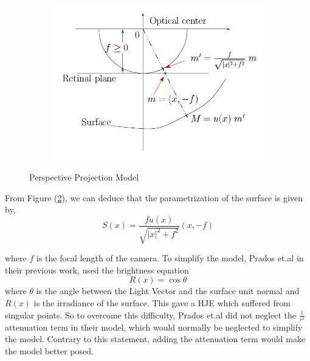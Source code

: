 \begin{figure}
\begin{subfigure}{0.5\textwidth}
    \includegraphics[scale = 0.65]{images/persp1.png}
    \label{fig:3b}
  \end{subfigure}
  \caption{Perspective Projection Model}
\end{figure}

\noindent
From Figure (\ref{fig:3b}), we can deduce that the parametrization of
the surface is given by,
\begin{equation}
  S(x) = \frac{fu(x)}{\sqrt{\lvert x \rvert^2 + f^2}} (x,-f)
\end{equation}

\noindent
where $f$ is the focal length of the camera. To simplify the model, Prados et.al in their previous work\cite{prados1}, used the
brightness equation
\begin{equation}
  R(x) = \cos \theta \label{eq:15}
\end{equation}
where $\theta$ is the angle between the Light Vector and the surface
unit normal and $R(x)$ is the irradiance of the surface. This gave a HJE which
suffered from singular points. So to overcome this difficulty, Prados
et.al\cite{prados2} did not neglect the $\frac{1}{r^2}$ attenuation term in their
model, which would normally be neglected to simplify the
model. Contrary to this statement, adding the attenuation term would
make the model better posed.\\

